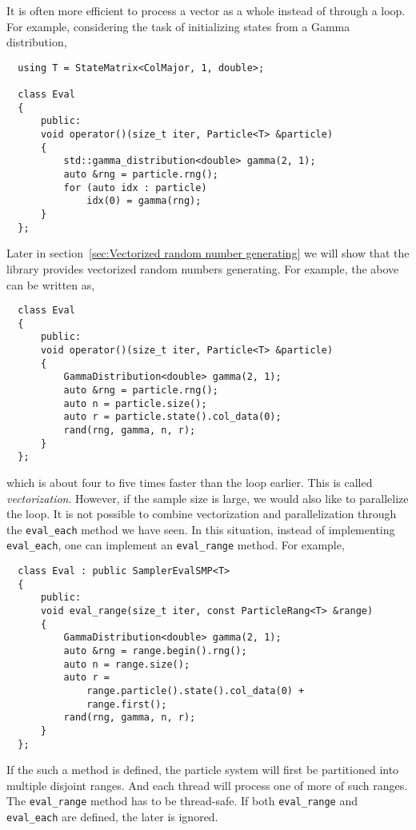 It is often more efficient to process a vector as a whole instead of through a
loop. For example, considering the task of initializing states from a Gamma
distribution,
\begin{Verbatim}
  using T = StateMatrix<ColMajor, 1, double>;

  class Eval
  {
      public:
      void operator()(size_t iter, Particle<T> &particle)
      {
          std::gamma_distribution<double> gamma(2, 1);
          auto &rng = particle.rng();
          for (auto idx : particle)
              idx(0) = gamma(rng);
      }
  };
\end{Verbatim}
Later in section~\ref{sec:Vectorized random number generating} we will show
that the library provides vectorized random numbers generating. For example,
the above can be written as,
\begin{Verbatim}
  class Eval
  {
      public:
      void operator()(size_t iter, Particle<T> &particle)
      {
          GammaDistribution<double> gamma(2, 1);
          auto &rng = particle.rng();
          auto n = particle.size();
          auto r = particle.state().col_data(0);
          rand(rng, gamma, n, r);
      }
  };
\end{Verbatim}
which is about four to five times faster than the loop earlier. This is called
\emph{vectorization}. However, if the sample size is large, we would also like
to parallelize the loop. It is not possible to combine vectorization and
parallelization through the \verb|eval_each| method we have seen. In this
situation, instead of implementing \verb|eval_each|, one can implement an
\verb|eval_range| method. For example,
\begin{Verbatim}
  class Eval : public SamplerEvalSMP<T>
  {
      public:
      void eval_range(size_t iter, const ParticleRang<T> &range)
      {
          GammaDistribution<double> gamma(2, 1);
          auto &rng = range.begin().rng();
          auto n = range.size();
          auto r =
              range.particle().state().col_data(0) +
              range.first();
          rand(rng, gamma, n, r);
      }
  };
\end{Verbatim}
If the such a method is defined, the particle system will first be partitioned
into multiple disjoint ranges. And each thread will process one of more of such
ranges. The \verb|eval_range| method has to be thread-safe. If both
\verb|eval_range| and \verb|eval_each| are defined, the later is ignored.

